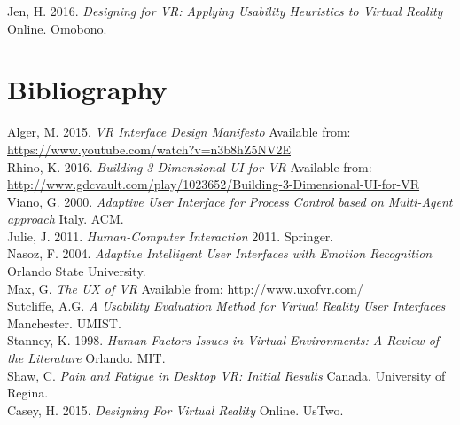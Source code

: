 \documentclass[11pt]{article}
\begin{document}
Jen, H. 2016. \emph{Designing for VR: Applying Usability Heuristics to Virtual Reality} Online. Omobono. \\

\section{Bibliography}

Alger, M. 2015. \emph{VR Interface Design Manifesto} Available from: \url{https://www.youtube.com/watch?v=n3b8hZ5NV2E} \\

Rhino, K. 2016. \emph{Building 3-Dimensional UI for VR} Available from: \url{http://www.gdcvault.com/play/1023652/Building-3-Dimensional-UI-for-VR} \\

Viano, G. 2000. \emph{Adaptive User Interface for Process Control based on Multi-Agent approach} Italy. ACM. \\

Julie, J. 2011. \emph{Human-Computer Interaction} 2011. Springer. \\

Nasoz, F. 2004. \emph{Adaptive Intelligent User Interfaces with Emotion Recognition} Orlando State University. \\

Max, G. \emph{The UX of VR} Available from: \url{http://www.uxofvr.com/} \\

Sutcliffe, A.G. \emph{A Usability Evaluation Method for Virtual Reality User Interfaces} Manchester. UMIST. \\

Stanney, K. 1998. \emph{Human Factors Issues in Virtual Environments: A Review of the Literature} Orlando. MIT. \\

Shaw, C. \emph{Pain and Fatigue in Desktop VR: Initial Results} Canada. University of Regina. \\

Casey, H. 2015. \emph{Designing For Virtual Reality} Online. UsTwo. \\
\end{document}
